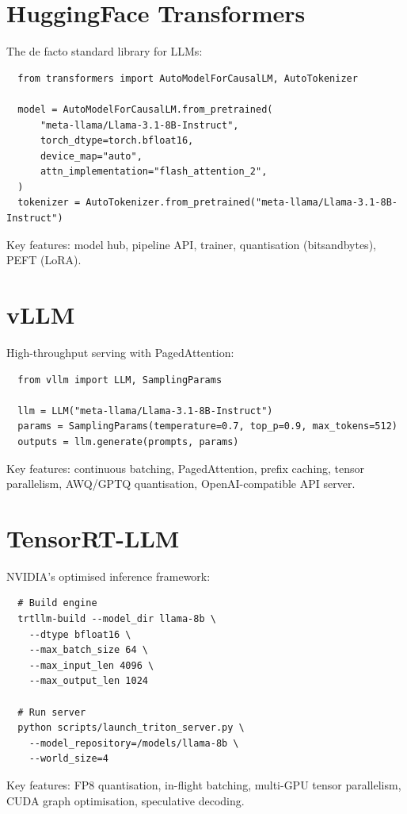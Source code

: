 \documentclass[11pt,a4paper]{book}
\theoremstyle{definition}
\begin{document}
\section{HuggingFace Transformers}

The de facto standard library for LLMs:
\begin{lstlisting}
  from transformers import AutoModelForCausalLM, AutoTokenizer

  model = AutoModelForCausalLM.from_pretrained(
      "meta-llama/Llama-3.1-8B-Instruct",
      torch_dtype=torch.bfloat16,
      device_map="auto",
      attn_implementation="flash_attention_2",
  )
  tokenizer = AutoTokenizer.from_pretrained("meta-llama/Llama-3.1-8B-Instruct")
\end{lstlisting}

Key features: model hub, pipeline API, trainer, quantisation (bitsandbytes), PEFT (LoRA).

\section{vLLM}

High-throughput serving with PagedAttention:
\begin{lstlisting}
  from vllm import LLM, SamplingParams

  llm = LLM("meta-llama/Llama-3.1-8B-Instruct")
  params = SamplingParams(temperature=0.7, top_p=0.9, max_tokens=512)
  outputs = llm.generate(prompts, params)
\end{lstlisting}

Key features: continuous batching, PagedAttention, prefix caching, tensor parallelism, AWQ/GPTQ quantisation, OpenAI-compatible API server.

\section{TensorRT-LLM}

NVIDIA's optimised inference framework:
\begin{lstlisting}
  # Build engine
  trtllm-build --model_dir llama-8b \
    --dtype bfloat16 \
    --max_batch_size 64 \
    --max_input_len 4096 \
    --max_output_len 1024

  # Run server
  python scripts/launch_triton_server.py \
    --model_repository=/models/llama-8b \
    --world_size=4
\end{lstlisting}

Key features: FP8 quantisation, in-flight batching, multi-GPU tensor parallelism, CUDA graph optimisation, speculative decoding.
\end{document}

